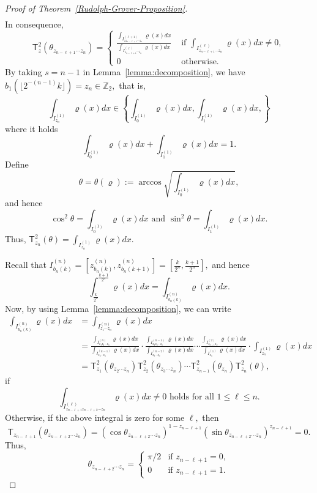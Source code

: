 \documentclass[a4paper,11pt]{article}
\newcommand{\rT}{\mathsf{T}}
\begin{document}
\begin{proof}[Proof of Theorem~\ref{Rudolph-Grover-Proposition}]
\begin{align*}
  \end{align*}
In consequence, 
  $$
  \rT_z^2(\theta_{z_{n-\ell+1}\cdots z_n}) = \left\{
    \begin{array}{ll}
      \frac{\int_{I_{zz_{n-\ell+1}\cdots z_n}^{(\ell+1)}} \varrho(x) dx}{ \int_{I_{z_{n-\ell+1}\cdots z_n}^{(\ell)}} \varrho(x) dx} & \text{ if } \int_{I_{z_{n-\ell+1}\cdots z_n}^{(\ell)}} \varrho(x) dx \neq 0, \\
    0 & \text{ otherwise. }
\end{array}
\right.
  $$
  By taking $s = n- 1$ in Lemma~\ref{lemma:decomposition},  we have $b_{1}(\lfloor 2^{-(n-1)}k \rfloor) = z_n \in \mathbb{Z}_2,$ that is,
  $$
  \int_{I_{z_n}^{(1)}} \varrho(x) dx \in \left\{
  \int_{I_{0}^{(1)}} \varrho(x) dx, \int_{I_{1}^{(1)}} \varrho(x) dx,
  \right\}
  $$
  where it holds
  $$
  \int_{I_{0}^{(1)}} \varrho(x) dx + \int_{I_{1}^{(1)}} \varrho(x) dx = 1.
  $$
Define
  $$
  \theta = \theta(\varrho) := 
  \arccos \sqrt{\int_{I_{0}^{(1)}} \varrho(x) dx},
  $$
and hence 
$$
\cos^2 \theta = \int_{I_{0}^{(1)}} \varrho(x) dx \text{ and } \sin^2 \theta = \int_{I_{1}^{(1)}} \varrho(x) dx.
$$
Thus, $\rT_{z_n}^2(\theta) =  \int_{I_{z_n}^{(1)}}\varrho(x) dx.$


Recall that $I_{b_{n}(k)}^{(n)} =[z_{b_n(k)}^{(n)},z_{b_n(k+1)}^{(n)}] = [\frac{k}{2^n},\frac{k+1}{2^n}],$ and hence 
  $$
  \int_{\frac{k}{2^n}}^{ \frac{k+1}{2^n}} \varrho(x)dx = \int_{I_{b_{n}(k)}^{(n)}} \varrho(x) dx.
  $$
  Now, by using Lemma~\ref{lemma:decomposition}, we can write
    \begin{align*}
    \int_{I_{b_{n}(k)}^{(n)}} \varrho(x) dx  & = 
    \int_{I_{z_1\cdots z_n}^{(n)}} \varrho(x) dx  \\  
    & = 
    \frac{\int_{I_{z_1z_2\cdots z_n}^{(n)}} \varrho(x) dx}{ \int_{I_{z_2\cdots z_n}^{(n-1)}} \varrho(x) dx}
     \cdot \frac{\int_{I_{z_2z_3\cdots z_n}^{(n-1)}} \varrho(x) dx}{ \int_{I_{z_3\cdots z_n}^{(n-2)}} \varrho(x) dx} \cdots 
     \frac{\int_{I_{z_{n-1}z_n}^{(2)}} \varrho(x) dx}{ \int_{I_{z_n}^{(1)}} \varrho(x) dx} \cdot \int_{I_{z_n}^{(1)}} \varrho(x) dx \\
     & =  \rT_{z_1}^2(\theta_{z_{2}\cdots z_n})\rT_{z_{2}}^2(\theta_{z_{3}\cdots z_n}) \cdots \rT_{z_{n-1}}^2(\theta_{z_n})\rT_{z_n}^2(\theta),
    \end{align*}
    if 
    $$
    \int_{I_{z_{n-\ell+1}z_{n-\ell +2}\cdots z_n}^{(\ell)}} \varrho(x) dx \neq 0 \text{ holds for all } 1 \le \ell \le n.
    $$
Otherwise, if the above integral is zero for some $\ell,$ then 
$$
\rT_{z_{n-\ell +1}}(\theta_{z_{n-\ell+2}\cdots z_n}) = (\cos \theta_{z_{n-\ell+2}\cdots z_n})^{1-z_{n-\ell +1}}(\sin \theta_{z_{n-\ell+2}\cdots z_n})^{z_{n-\ell +1}}  = 0.
$$
Thus,
$$
\theta_{z_{n-\ell+2}\cdots z_n} = \left\{ 
\begin{array}{ll}
  \pi/2  & \text{if } z_{n-\ell +1} = 0, \\
 0 & \text{if } z_{n-\ell +1} = 1. 
\end{array}
\right.
$$


\end{proof}
\end{document}
